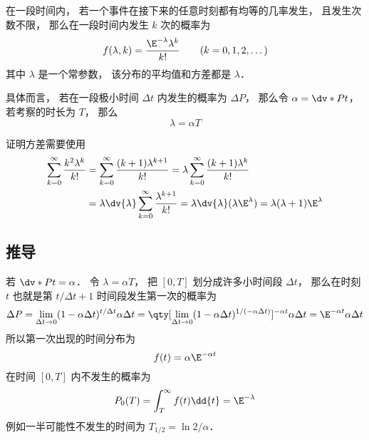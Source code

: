 

在一段时间内， 若一个事件在接下来的任意时刻都有均等的几率发生， 且发生次数不限， 那么在一段时间内发生 $k$ 次的概率为
\begin{equation}
f(\lambda, k) = \frac{\E^{-\lambda}\lambda^k}{k!} \qquad (k = 0,1,2,\dots)
\end{equation}
其中 $\lambda$ 是一个常参数， 该分布的平均值和方差都是 $\lambda$．

具体而言， 若在一段极小时间 $\Delta t$ 内发生的概率为 $\Delta P$， 那么令 $\alpha = \dv*{P}{t}$， 若考察的时长为 $T$， 那么
\begin{equation}
\lambda = \alpha T
\end{equation}


证明方差需要使用
\begin{equation}
\begin{aligned}
\sum_{k=0}^\infty \frac{k^2\lambda^{k}}{k!}
&= \sum_{k=0}^\infty \frac{(k+1)\lambda^{k+1}}{k!}
= \lambda \sum_{k=0}^\infty \frac{(k+1)\lambda^k}{k!}\\
&= \lambda\dv{\lambda} \sum_{k=0}^\infty \frac{\lambda^{k+1}}{k!}
= \lambda \dv{\lambda} (\lambda \E^{\lambda})
= \lambda(\lambda+1)\E^{\lambda}
\end{aligned}
\end{equation}

\subsection{推导}
若 $\dv*{P}{t} = \alpha$． 令 $\lambda = \alpha T$， 把 $[0,T]$ 划分成许多小时间段 $\Delta t$， 那么在时刻 $t$ 也就是第 $t/\Delta t+1$ 时间段发生第一次的概率为
\begin{equation}
\Delta P = \lim_{\Delta t\to 0}(1 - \alpha\Delta t)^{t/\Delta t} \alpha\Delta t
= \qty[\lim_{\Delta t\to 0}(1 - \alpha\Delta t)^{1/(-\alpha\Delta t)}]^{-\alpha t} \alpha\Delta t
= \E^{-\alpha t} \alpha \Delta t
\end{equation}
所以第一次出现的时间分布为
\begin{equation}
f(t) = \alpha\E^{-\alpha t}
\end{equation}
在时间 $[0,T]$ 内不发生的概率为
\begin{equation}
P_0(T) = \int_{T}^\infty f(t) \dd{t} = \E^{-\lambda}
\end{equation}
例如一半可能性不发生的时间为 $T_{1/2} = \ln 2/\alpha$．

